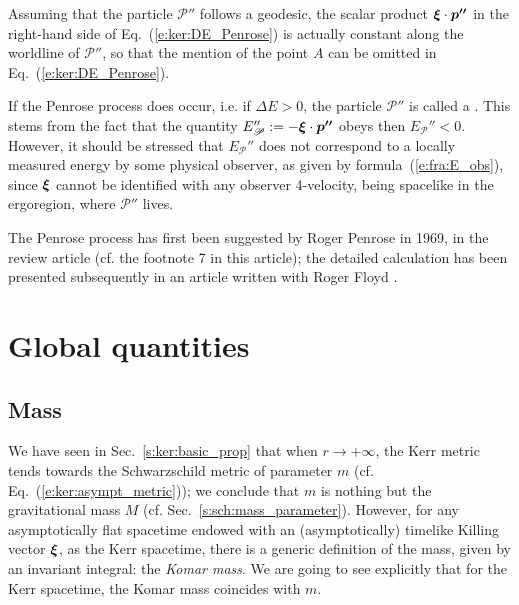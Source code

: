 \begin{remark}
Assuming that the particle $\mathscr{P}''$ follows a geodesic,
the scalar product $\bm{\xi} \cdot \bm{p''}$ in the right-hand side of Eq.~(\ref{e:ker:DE_Penrose}) is actually constant along the worldline of
$\mathscr{P}''$, so that the mention of the point $A$ can be omitted in
Eq.~(\ref{e:ker:DE_Penrose}).
\end{remark}

\begin{remark}
If the Penrose process does occur, i.e. if
$\Delta E > 0$, the particle $\mathscr{P}''$ is called a
. This
stems from the fact that the quantity
$E_\mathscr{P}'' := - \bm{\xi}\cdot\bm{p''}$ obeys
then $E_\mathscr{P}'' < 0$. However, it should be stressed that
$E_\mathscr{P}''$ does not correspond to a locally measured energy by some
physical observer, as given by formula~(\ref{e:fra:E_obs}), since $\bm{\xi}$ cannot be identified with any observer
4-velocity, being spacelike in the ergoregion, where $\mathscr{P}''$ lives.
\end{remark}

\begin{hist}
The Penrose process has first been suggested by Roger Penrose
in 1969,
in the review article \cite{Penro69} (cf. the footnote 7 in this article);
the detailed calculation has been presented subsequently in an
article written with Roger Floyd \cite{PenroF71}.
\end{hist}



\section{Global quantities} \label{s:ker:global_quantities}

\subsection{Mass} \label{s:ker:Komar_mass}

We have seen in Sec.~\ref{s:ker:basic_prop} that when
$r\rightarrow +\infty$, the Kerr metric tends towards the Schwarzschild
metric of parameter $m$ (cf. Eq.~(\ref{e:ker:asympt_metric}));
we conclude that $m$ is nothing but the gravitational mass $M$ (cf.
Sec.~\ref{s:sch:mass_parameter}).
However, for any asymptotically flat spacetime endowed with
an (asymptotically) timelike Killing vector $\bm{\xi}$, as the Kerr spacetime,
there is a generic definition of the mass, given by an invariant integral:
the \emph{Komar mass}. We are going to see explicitly
that for the Kerr spacetime, the Komar mass coincides with $m$.

